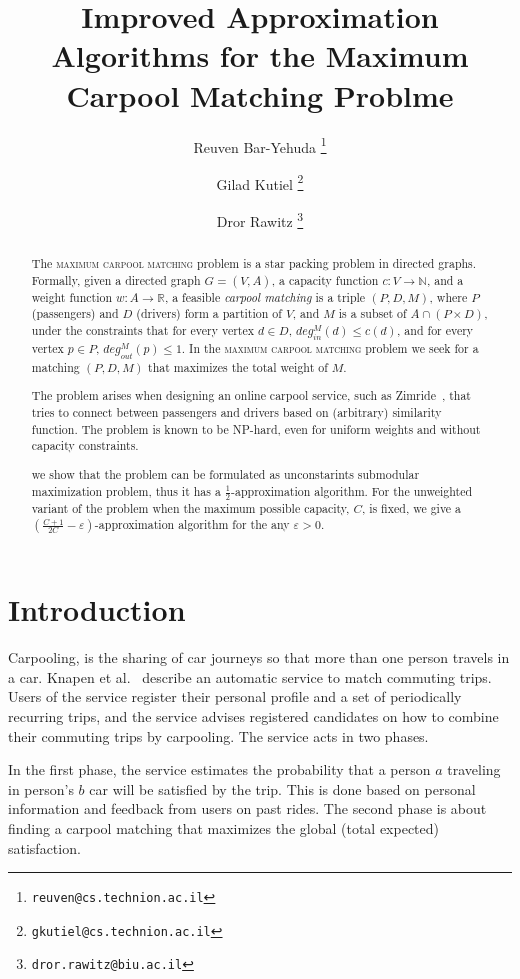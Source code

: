 \documentclass[draft]{article}
\title{Improved Approximation Algorithms for the Maximum Carpool Matching
Problme}
\date{}
\author[1]{Reuven Bar-Yehuda	\thanks{\texttt{reuven@cs.technion.ac.il}}}
\author[1]{Gilad Kutiel			\thanks{\texttt{gkutiel@cs.technion.ac.il}}}
\author[2]{Dror Rawitz			\thanks{\texttt{dror.rawitz@biu.ac.il}}}
\affil[1]{Department of Computer Science, Technion, Haifa, Israel}
\affil[2]{Faculty of Engineering, Bar Ilan University, Ramt-Gan, Israel}
\def\CARPOOL{maximum carpool matching}
\newcommand{\din}[1][M]{deg^{#1}_{in}}
\newcommand{\dout}[1][M]{deg^{#1}_{out}}
\def\R{\mathbb{R}}
\def\N{\mathbb{N}}
\begin{document}
\maketitle

\begin{abstract}
The \textsc{\CARPOOL{}} problem is a star packing problem in directed graphs.
Formally, given a directed graph $G = (V, A)$,
a capacity function $ c: V \rightarrow \N $,
and a weight function $w : A \rightarrow \R $,
a feasible \emph{carpool matching} is a triple 
$(P, D, M)$, where $P$ (passengers) and $D$ (drivers) form a partition of $V$, 
and $M$ is a subset of $A \cap (P \times D)$,
under the constraints that for every vertex $d \in D$, 
$\din(d) \leq c(d)$, 
and for every vertex $p \in P$, $\dout(p) \leq 1$.
In the \textsc{\CARPOOL{}} problem we seek for a matching $(P, D, M)$ that maximizes the
total weight of $M$.

The problem arises when designing an online carpool service, 
such as Zimride~\cite{zimride}, 
that tries to connect between passengers and drivers based on (arbitrary) similarity function.
The problem is known to be NP-hard, 
even for uniform weights and without capacity constraints.

we show that the problem can be formulated as
unconstarints submodular maximization problem, 
thus it has a $\frac{1}{2}$-approximation algorithm.
For the unweighted variant of the problem when the maximum possible capacity, $C$, is
fixed, we give a $(\frac{C + 1}{2C} - \varepsilon)$-approximation algorithm
for the any $\varepsilon > 0$.
\end{abstract}

\section{Introduction}
Carpooling, is the sharing of car journeys so that more than one person travels
in a car.
Knapen et al.~\cite{knapen2013estimating} describe an automatic service
to match commuting trips.
Users of the service register their personal profile and a set of periodically
recurring trips, 
and the service advises registered candidates on how to combine their commuting
trips by carpooling.
The service acts in two phases. 

In the first phase, the service estimates the probability that a person $a$
traveling in person's $b$ car will be satisfied by the trip.
This is done based on personal information and feedback from users on past
rides.
The second phase is about finding a carpool matching
that maximizes the global (total expected) satisfaction.
\end{document}
